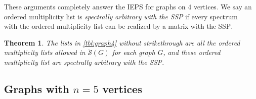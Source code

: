 \documentclass{article}
\newtheorem{theorem}{Theorem}[section]
\theoremstyle{definition}
\newcommand{\mdso}{\ddot{\mathcal{S}}}
\begin{document}
These arguments completely answer the IEPS for graphs on $4$ vertices.  We say an ordered multiplicity list is \emph{spectrally arbitrary with the SSP} if every spectrum with the ordered multiplicity list can be realized by a matrix with the SSP.

\begin{theorem}
\label{thm:graph4}
The lists in \cref{tbl:graph4} without strikethrough are all the ordered multiplicity lists allowed in $\mdso(G)$ for each graph $G$, and these ordered multiplicity list are spectrally arbitrary with the SSP.
\end{theorem}

\subsection{Graphs with \texorpdfstring{$n = 5$}{n = 5} vertices}
\label{ssec:graph5}
\end{document}
